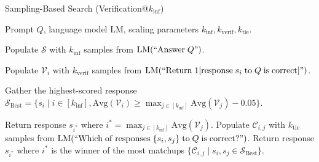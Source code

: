 \begin{algorithm}[htbp]
\caption{Sampling-Based Search (Verification@$k_{\mathrm{inf}}$)}
\label{alg:verification-pipeline}
\begin{algorithmic}[1]

\Require Prompt $Q$, language model $\mathrm{LM}$, scaling parameters $k_{\mathrm{inf}}, k_{\mathrm{verif}}, k_{\mathrm{tie}}$.

\State Populate $\mathcal{S}$ with $k_{\mathrm{inf}}$ samples from $\mathrm{LM}(``\mathrm{Answer} \;Q")$. 

    \State Populate $\mathcal{V}_i$ with $k_{\mathrm{verif}}$ samples from $\mathrm{LM}(``\mathrm{Return}\;1[\mathrm{response} \; s_i \; \mathrm{to} \;Q \;\mathrm{is \;correct}]")$.
\EndFor

\State Gather the highest-scored response  $\mathcal{S}_{\mathrm{Best}} = \{s_i \mid i \in [k_{\mathrm{inf}}], \mathrm{Avg}(\mathcal{V}_i) \geq \max_{j \in [k_{\mathrm{inf}}]} \mathrm{Avg}(\mathcal{V}_j) - 0.05\}$.

    \State Return response $s_{i^*}$ where $i^* = \max_{j \in [k_{\mathrm{inf}}]} \mathrm{Avg}(\mathcal{V}_j)$.
\Else
    \State Populate $\mathcal{C}_{i,j}$ with $k_{\mathrm{tie}}$ samples from $\mathrm{LM}(``\mathrm{Which\;of\;responses\;}\{s_i, s_j\}\mathrm{\;to\;}Q\;\mathrm{is \;correct?}")$. 
    \EndFor
    \State Return response $s_{i^*}$ where $i^*$ is the winner of the most matchups $\{\mathcal{C}_{i,j} \mid s_i, s_j \in \mathcal{S}_{\mathrm{Best}}\}$.
\EndIf

\end{algorithmic}
\end{algorithm}
